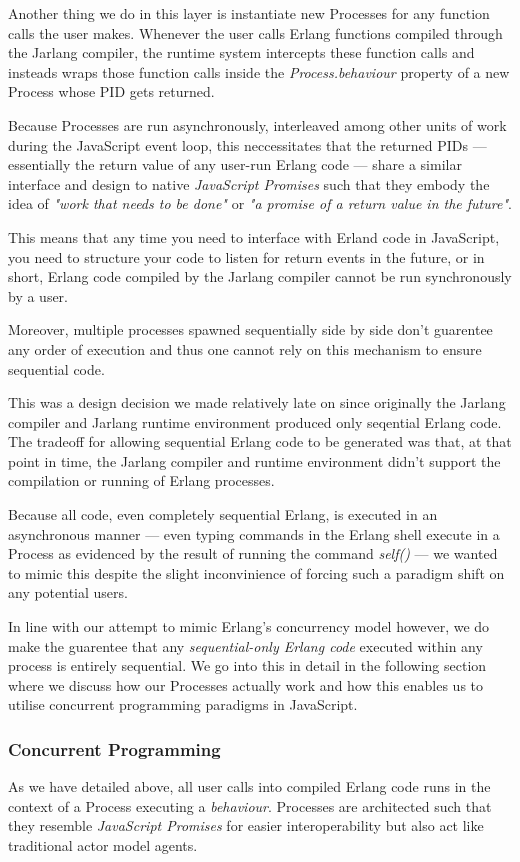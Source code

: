 \documentclass[twoside,12pt,titlepage,a4paper]{article}
\begin{document}
Another thing we do in this layer is instantiate new Processes for any function calls the user makes. Whenever the user calls Erlang functions compiled through the Jarlang compiler, the runtime system intercepts these function calls and insteads wraps those function calls inside the \textit{Process.behaviour} property of a new Process whose PID gets returned.

Because Processes are run asynchronously, interleaved among other units of work during the JavaScript event loop, this neccessitates that the returned PIDs --- essentially the return value of any user-run Erlang code --- share a similar interface and design to native \textit{JavaScript Promises} such that they embody the idea of \textit{"work that needs to be done"} or \textit{"a promise of a return value in the future"}.

This means that any time you need to interface with Erland code in JavaScript, you need to structure your code to listen for return events in the future, or in short, Erlang code compiled by the Jarlang compiler cannot be run synchronously by a user.

Moreover, multiple processes spawned sequentially side by side don't guarentee any order of execution and thus one cannot rely on this mechanism to ensure sequential code.

This was a design decision we made relatively late on since originally the Jarlang compiler and Jarlang runtime environment produced only seqential Erlang code. The tradeoff for allowing sequential Erlang code to be generated was that, at that point in time, the Jarlang compiler and runtime environment didn't support the compilation or running of Erlang processes.

Because all code, even completely sequential Erlang, is executed in an asynchronous manner --- even typing commands in the Erlang shell execute in a Process as evidenced by the result of running the command \textit{self()} --- we wanted to mimic this despite the slight inconvinience of forcing such a paradigm shift on any potential users.

In line with our attempt to mimic Erlang's concurrency model however, we do make the guarentee that any \textit{sequential-only Erlang code} executed within any process is entirely sequential. We go into this in detail in the following section where we discuss how our Processes actually work and how this enables us to utilise concurrent programming paradigms in JavaScript. 

\subsubsection{Concurrent Programming} \label{sssec:num2}
As we have detailed above, all user calls into compiled Erlang code runs in the context of a Process executing a \textit{behaviour}. Processes are architected such that they resemble \textit{JavaScript Promises} for easier interoperability but also act like traditional actor model agents.
\end{document}
